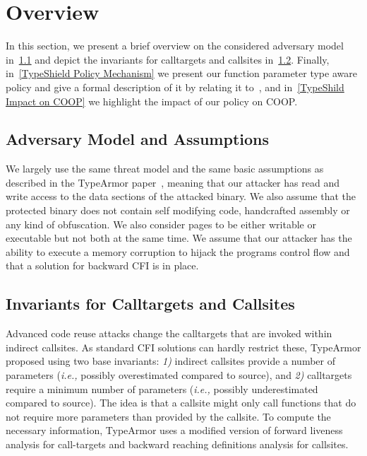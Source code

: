 \section{Overview}
\label{chapter:TypeShild Overview}
In this section, we present a brief overview on the 
considered adversary model in~\cref{Adversary Model} and depict the 
invariants for calltargets and callsites in~\cref{Invariants for Targets and Callsites}.
Finally, in~\cref{TypeShield Policy Mechanism} we present our function parameter type aware policy and give a formal description of it
by relating it to~\cite{veen:typearmor}, and in~\cref{TypeShild Impact on COOP} we highlight the impact of our policy on COOP.

\subsection{Adversary Model and Assumptions}
\label{Adversary Model}

We largely use the same threat model and the same basic assumptions as described in the TypeArmor 
paper~\cite{veen:typearmor}, meaning that our attacker has read and write access to the data 
sections of the attacked binary.  We also assume that the protected binary does not contain 
self modifying code, handcrafted assembly or any kind of obfuscation. We also consider pages 
to be either writable or executable but not both at the same time. We assume 
that our attacker has the ability to execute a memory corruption to hijack the programs 
control flow and that a solution for backward CFI is in place.

\subsection{Invariants for Calltargets and Callsites}
\label{Invariants for Targets and Callsites}
Advanced code reuse attacks change the calltargets that are invoked within indirect 
callsites. As standard CFI solutions can hardly restrict these, TypeArmor proposed using two base invariants:
\textit{1)} indirect callsites provide a number of parameters (\textit{i.e.,} possibly overestimated compared to source), and 
\textit{2)} calltargets require a minimum number of parameters (\textit{i.e.,} possibly underestimated compared to source).
The idea is that a callsite might only call functions that do not require more parameters than provided by the callsite. 
To compute the necessary information, TypeArmor uses a modified version of forward liveness analysis for call-targets and 
backward reaching definitions analysis for callsites.

